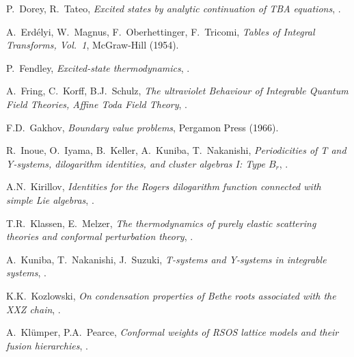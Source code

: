 \documentclass[12pt]{article}
\theoremstyle{plain}
\theoremstyle{definition}
\numberwithin{equation}{section}
\numberwithin{theorem}{section}
\begin{document}
\begin{thebibliography}{YYY}
  P.~Dorey,  R.~Tateo,
  {\it Excited states by analytic continuation of TBA equations},
  .
  
  A.~Erd\'elyi, W.~Magnus, F.~Oberhettinger, F.~Tricomi,
  {\it Tables of Integral Transforms, Vol.\ 1}, McGraw-Hill (1954).
  
  P.~Fendley,
  {\it Excited-state thermodynamics},
  .

  A.~Fring, C.~Korff, B.J.~Schulz,
  {\it The ultraviolet Behaviour of Integrable Quantum Field Theories, Affine Toda Field Theory},
  .

  F.D.~Gakhov,
  {\it Boundary value problems},
  {Pergamon Press (1966)}.
  
R.~Inoue, O.~Iyama, B.~Keller, A.~Kuniba, T.~Nakanishi,
{\it Periodicities of T and Y-systems, dilogarithm identities, and cluster algebras I: Type $B_r$},
.

A.N.~Kirillov,
{\it Identities for the Rogers dilogarithm function connected with simple Lie algebras},
.
   	
  T.R.~Klassen, E.~Melzer,
  {\it The thermodynamics of purely elastic scattering theories and conformal perturbation theory},
  .
  
  A.~Kuniba, T.~Nakanishi, J.~Suzuki,
  {\it T-systems and Y-systems in integrable systems},
  .
  
  K.K.~Kozlowski,
  {\it On condensation properties of Bethe roots associated with the XXZ chain},
  .
  
  A.~Kl\"umper, P.A.~Pearce,
  {\it Conformal weights of RSOS lattice models and their fusion hierarchies},
  .


\end{thebibliography}
\end{document}
